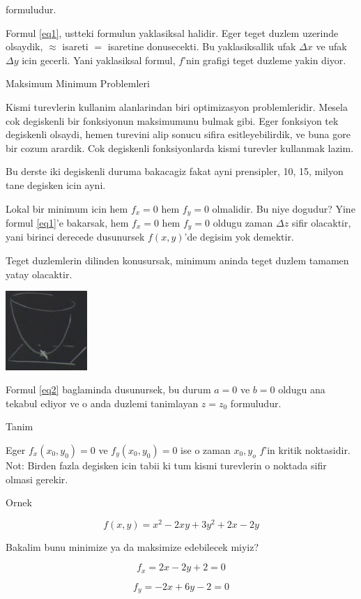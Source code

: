 \documentclass[12pt,fleqn]{article}\usepackage{../common}
\begin{document}
formuludur. 

Formul \ref{eq1}, ustteki formulun yaklasiksal halidir. Eger teget duzlem
uzerinde olsaydik, $\approx$ isareti $=$ isaretine donusecekti. Bu
yaklasiksallik ufak $\Delta x$ ve ufak $\Delta y$ icin gecerli. Yani
yaklasiksal formul, $f$'nin grafigi teget duzleme yakin diyor. 

Maksimum Minimum Problemleri 

Kismi turevlerin kullanim alanlarindan biri optimizasyon
problemleridir. Mesela cok degiskenli bir fonksiyonun maksimumunu bulmak
gibi. Eger fonksiyon tek degiskenli olsaydi, hemen turevini alip sonucu
sifira esitleyebilirdik, ve buna gore bir cozum arardik. Cok degiskenli
fonksiyonlarda kismi turevler kullanmak lazim. 

Bu derste iki degiskenli duruma bakacagiz fakat ayni prensipler, 10, 15,
milyon tane degisken icin ayni. 

Lokal bir minimum icin hem $f_x=0$ hem $f_y=0$ olmalidir. Bu niye
dogudur? Yine formul \ref{eq1}'e bakarsak, hem $f_x=0$ hem $f_y=0$ oldugu
zaman $\Delta z$ sifir olacaktir, yani birinci derecede dusunursek
$f(x,y)$'de degisim yok demektir. 

Teget duzlemlerin dilinden konusursak, minimum aninda teget duzlem tamamen
yatay olacaktir. 

\includegraphics[height=3cm]{9_3.png}

Formul \ref{eq2} baglaminda dusunursek, bu durum $a=0$ ve $b=0$ oldugu ana
tekabul ediyor ve o anda duzlemi tanimlayan $z = z_0$ formuludur. 

Tanim

Eger $f_x(x_0,y_0)= 0$ ve $f_y(x_0,y_0)= 0$ ise o zaman $x_0,y_o$ $f$'in
kritik noktasidir. Not: Birden fazla degisken icin tabii ki tum kismi
turevlerin o noktada sifir olmasi gerekir.

Ornek

\[ f(x,y) = x^2 - 2xy + 3y^2 + 2x - 2y \]

Bakalim bunu minimize ya da maksimize edebilecek miyiz? 

\[ f_x = 2x - 2y + 2 = 0\]

\[ f_y = -2x + 6y - 2 = 0 \]
\end{document}
